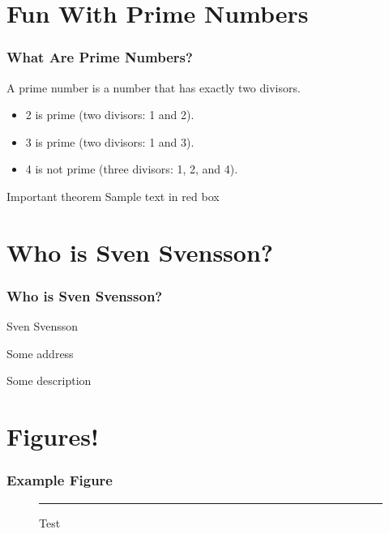 \documentclass{beamer}
\begin{document}
\section{Fun With Prime Numbers}

\begin{frame}
    \frametitle{What Are Prime Numbers?}
    \begin{definition}
        A \alert{prime number} is a number that has exactly two divisors.
    \end{definition}
    \begin{example}
        \begin{itemize}
            \item 2 is prime (two divisors: 1 and 2).
            \item 3 is prime (two divisors: 1 and 3).
            \item 4 is not prime (\alert{three} divisors: 1, 2, and 4).
        \end{itemize}
    \end{example}
    \begin{alertblock}{Important theorem}
        Sample text in red box
    \end{alertblock}
\end{frame}

\section{Who is Sven Svensson?}

\begin{frame}
    \frametitle{Who is Sven Svensson?}
    \begin{description}
        \item[Name] Sven Svensson
        \item[Address] Some address
        \item[Other description] Some description
    \end{description}
\end{frame}

\section{Figures!}

\begin{frame}
    \frametitle{Example Figure}

    \begin{figure}
        \rule{5cm}{5cm}
        \caption{Test}
    \end{figure}
\end{frame}
\end{document}

